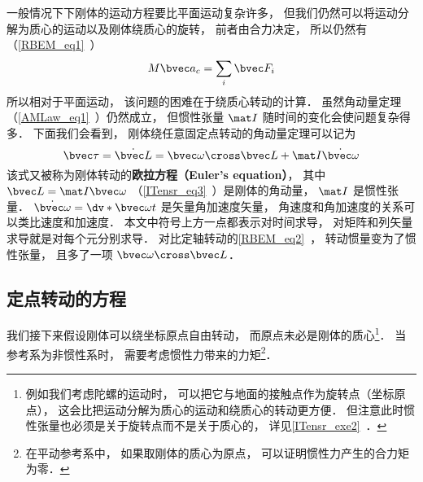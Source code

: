 

一般情况下下刚体的运动方程要比平面运动复杂许多， 但我们仍然可以将运动分解为质心的运动以及刚体绕质心的旋转， 前者由合力决定， 所以仍然有（\autoref{RBEM_eq1}~）
\begin{equation}\label{RBEqM_eq8}
M\bvec a_c = \sum_i \bvec F_i
\end{equation}
所以相对于平面运动， 该问题的困难在于绕质心转动的计算． 虽然角动量定理（\autoref{AMLaw_eq1}~）仍然成立， 但惯性张量 $\mat I$ 随时间的变化会使问题复杂得多． 下面我们会看到， 刚体绕任意固定点转动的角动量定理可以记为
\begin{equation}\label{RBEqM_eq1}
\bvec\tau = \dot{\bvec L} = \bvec\omega \cross \bvec L + \mat I \dot{\bvec\omega}
\end{equation}
该式又被称为刚体转动的\textbf{欧拉方程（Euler's equation）}， 其中 $\bvec L = \mat I\bvec\omega$ （\autoref{ITensr_eq3}~）是刚体的角动量， $\mat I$ 是惯性张量． $\dot{\bvec\omega} = \dv*{\bvec\omega}{t}$ 是矢量角加速度矢量， 角速度和角加速度的关系可以类比速度和加速度． 本文中符号上方一点都表示对时间求导， 对矩阵和列矢量求导就是对每个元分别求导．  对比定轴转动的\autoref{RBEM_eq2}~， 转动惯量变为了惯性张量， 且多了一项 $\bvec\omega \cross \bvec L$．

\subsection{定点转动的方程}
我们接下来假设刚体可以绕坐标原点自由转动， 而原点未必是刚体的质心\footnote{例如我们考虑陀螺的运动时， 可以把它与地面的接触点作为旋转点（坐标原点）， 这会比把运动分解为质心的运动和绕质心的转动更方便． 但注意此时惯性张量也必须是关于旋转点而不是关于质心的， 详见\autoref{ITensr_exe2}~．}． 当参考系为非惯性系时， 需要考虑惯性力带来的力矩\footnote{在平动参考系中， 如果取刚体的质心为原点， 可以证明惯性力产生的合力矩为零．}．


